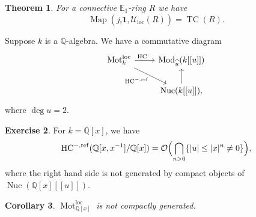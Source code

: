 \documentclass[draft]{amsart}
\newcommand{\QQ}{\mathbb{Q}}
\newcommand{\EE}{\mathbb{E}}
\renewcommand{\O}{\mathcal{O}}
\newcommand{\wh}[1]{\widehat{#1}}
\newcommand{\cat}[1]{\mathcal{#1}}
\newcommand{\one}{\mathbf{1}}
\DeclareMathOperator{\TC}{TC}
\DeclareMathOperator{\Map}{Map}
\DeclareMathOperator{\Nuc}{Nuc}
\DeclareMathOperator{\Mod}{Mod}
\DeclareMathOperator{\Mot}{Mot}
\newtheorem{thm}{Theorem}[section]
\newtheorem{cor}[thm]{Corollary}
\theoremstyle{definition}
\newtheorem{exercise}[thm]{Exercise}
\begin{document}
\begin{thm}
For a connective $\EE_1$-ring $R$ we have
\[
\Map(j_!\one, \cat U_{\mathrm{loc}}(R)) = \TC(R).
\]
\end{thm}

Suppose $k$ is a $\QQ$-algebra. We have a commutative diagram
\[
\begin{tikzcd}
\Mot_k^{\mathrm{loc}} \ar[r, "\mathrm{HC}^-"] \ar[dr,"\mathrm{HC}^{-,\mathrm{ref}}"'] & \Mod_{\wh{u}}(k[[u]]) \\
& \Nuc(k[[u]])\ar[u],
\end{tikzcd}
\]
where $\deg u = 2$.

\begin{exercise}
For $k = \QQ[x]$, we have
\[
\mathrm{HC}^{-,\mathrm{ref}}(\QQ[x,x^{-1}]/\QQ[x]) = \O\Bigl(\bigcap_{n>0} \{ \lvert u\rvert \le \lvert x\rvert^n \neq 0\}\Bigr),
\]
where the right hand side is not generated by compact objects of $\Nuc(\QQ[x][[u]])$.
\end{exercise}

\begin{cor}
$\Mot^{\mathrm{loc}}_{\QQ[x]}$ is not compactly generated.
\end{cor}
\end{document}
